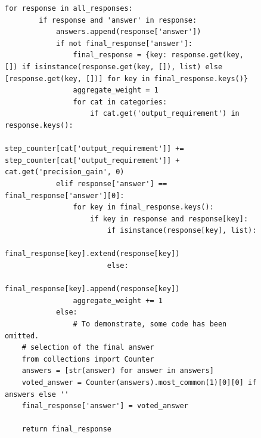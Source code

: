 \begin{figure}[ht]
\begin{lstlisting}[style=pythonstyle, caption={Code of the best policy found by \framework for DROP.}]
    for response in all_responses:
        if response and 'answer' in response:
            answers.append(response['answer'])
            if not final_response['answer']:
                final_response = {key: response.get(key, []) if isinstance(response.get(key, []), list) else [response.get(key, [])] for key in final_response.keys()}
                aggregate_weight = 1
                for cat in categories:
                    if cat.get('output_requirement') in response.keys():
                        step_counter[cat['output_requirement']] += step_counter[cat['output_requirement']] + cat.get('precision_gain', 0)
            elif response['answer'] == final_response['answer'][0]:
                for key in final_response.keys():
                    if key in response and response[key]:
                        if isinstance(response[key], list):
                            final_response[key].extend(response[key])
                        else:
                            final_response[key].append(response[key])
                aggregate_weight += 1
            else:
                # To demonstrate, some code has been omitted.
    # selection of the final answer
    from collections import Counter
    answers = [str(answer) for answer in answers]
    voted_answer = Counter(answers).most_common(1)[0][0] if answers else ''
    final_response['answer'] = voted_answer

    return final_response
\end{lstlisting}
\end{figure}

